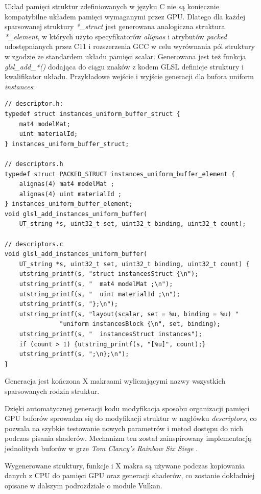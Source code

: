 Układ pamięci struktur zdefiniowanych w języku C nie są koniecznie kompatybilne układem pamięci wymaganymi przez GPU.
Dlatego dla każdej sparsowanej struktury \textit{*\_struct} jest generowana analogiczna struktura \textit{*\_element}, w których użyto specyfikatorów \textit{alignas} i atrybutów \textit{packed} udostępnianych przez C11 i rozszerzenia GCC w celu wyrównania pól struktury w zgodzie ze standardem układu pamięci scalar.
Generowana jest też funkcja \textit{glsl\_add\_*()} dodająca do ciągu znaków z kodem GLSL definicje struktury i kwalifikator układu.
Przykładowe wejście i wyjście generacji dla bufora uniform \textit{instances}:
\lstset{language=C}
\begin{lstlisting}[caption={Przykładowe wejście i wyjście generacji dla bufora uniform},captionpos=b]
// descriptor.h:
typedef struct instances_uniform_buffer_struct {
	mat4 modelMat;
	uint materialId;
} instances_uniform_buffer_struct;
	
// descriptors.h
typedef struct PACKED_STRUCT instances_uniform_buffer_element {
	alignas(4) mat4 modelMat ;
	alignas(4) uint materialId ;
} instances_uniform_buffer_element;
void glsl_add_instances_uniform_buffer(
	UT_string *s, uint32_t set, uint32_t binding, uint32_t count);

// descriptors.c
void glsl_add_instances_uniform_buffer(
	UT_string *s, uint32_t set, uint32_t binding, uint32_t count) {
	utstring_printf(s, "struct instancesStruct {\n");
	utstring_printf(s, "  mat4 modelMat ;\n");
	utstring_printf(s, "  uint materialId ;\n");
	utstring_printf(s, "};\n");
	utstring_printf(s, "layout(scalar, set = %u, binding = %u) "
			   "uniform instancesBlock {\n", set, binding);
	utstring_printf(s, "  instancesStruct instances");
	if (count > 1) {utstring_printf(s, "[%u]", count);}
	utstring_printf(s, ";\n};\n");
}
\end{lstlisting}
Generacja jest kończona X makraami wyliczającymi nazwy wszystkich sparsowanych rodzin struktur. 

Dzięki automatycznej generacji kodu modyfikacja sposobu organizacji pamięci GPU buforów sprowadza się do modyfikacji struktur w nagłówku \textit{descriptors}, co pozwala na szybkie testowanie nowych parametrów i metod dostępu do nich podczas pisania shaderów.
Mechanizm ten został zainspirowany implementacją jednolitych buforów w grze \textit{Tom Clancy's Rainbow Six Siege} \cite{RAINBOWSIXSIEGE}.

Wygenerowane struktury, funkcje i X makra są używane podczas kopiowania danych z CPU do pamięci GPU oraz generacji shaderów, co zostanie dokładniej opisane w dalszym podrozdziale o module Vulkan.

